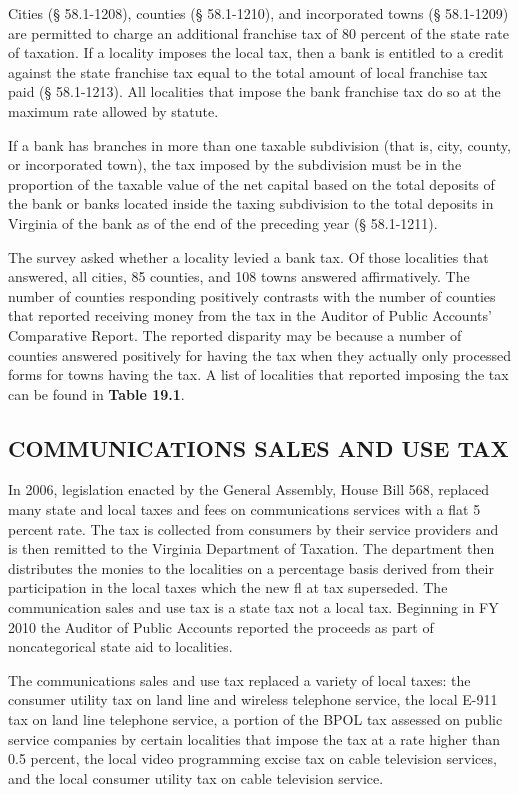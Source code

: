 \documentclass[
]{book}
\begin{document}
Cities (§ 58.1-1208), counties (§ 58.1-1210), and incorporated towns (§ 58.1-1209) are permitted to charge an additional franchise tax of 80 percent of the state rate of taxation. If a locality imposes the local tax, then a bank is entitled to a credit against the state franchise tax equal to the total amount of local franchise tax paid (§ 58.1-1213). All localities that impose the bank franchise tax do so at the maximum rate allowed by statute.

If a bank has branches in more than one taxable subdivision (that is, city, county, or incorporated town), the tax imposed by the subdivision must be in the proportion of the taxable value of the net capital based on the total deposits of the bank or banks located inside the taxing subdivision to the total deposits in Virginia of the bank as of the end of the preceding year (§ 58.1-1211).

The survey asked whether a locality levied a bank tax. Of those localities that answered, all cities, 85 counties, and 108 towns answered affirmatively. The number of counties responding positively contrasts with the number of counties that reported receiving money from the tax in the Auditor of Public Accounts' Comparative Report. The reported disparity may be because a number of counties answered positively for having the tax when they actually only processed forms for towns having the tax. A list of localities that reported imposing the tax can be found in \textbf{Table 19.1}.

\hypertarget{communications-sales-and-use-tax}{%
\subsection{COMMUNICATIONS SALES AND USE TAX}\label{communications-sales-and-use-tax}}

In 2006, legislation enacted by the General Assembly, House Bill 568, replaced many state and local taxes and fees on communications services with a flat 5 percent rate. The tax is collected from consumers by their service providers and is then remitted to the Virginia Department of Taxation. The department then distributes the monies to the localities on a percentage basis derived from their participation in the local taxes which the new fl at tax superseded. The communication sales and use tax is a state tax not a local tax. Beginning in FY 2010 the Auditor of Public Accounts reported the proceeds as part of noncategorical state aid to localities.

The communications sales and use tax replaced a variety of local taxes: the consumer utility tax on land line and wireless telephone service, the local E-911 tax on land line telephone service, a portion of the BPOL tax assessed on public service companies by certain localities that impose the tax at a rate higher than 0.5 percent, the local video programming excise tax on cable television services, and the local consumer utility tax on cable television service.
\end{document}
